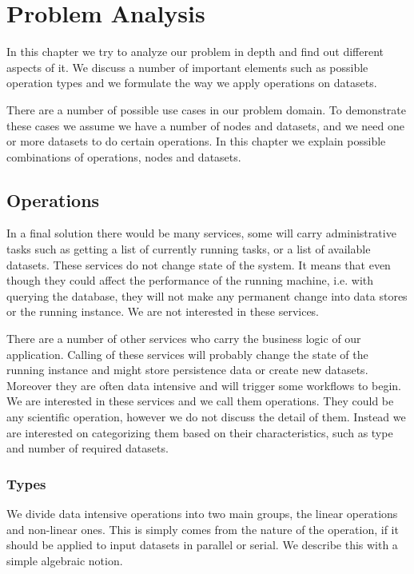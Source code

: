 \chapter{Problem Analysis}
\label{cha:analysis}

In this chapter we try to analyze our problem in depth and find out different aspects of it. We 
discuss a number of important elements such as possible operation types and we formulate the way
we apply operations on datasets.

There are a number of possible use cases in our problem domain. To demonstrate these cases we assume
we have a number of nodes and datasets, and we need one or more datasets to do certain operations.
In this chapter we explain possible combinations of operations, nodes and datasets.

\section{Operations}
In a final solution there would be many services, some will carry administrative tasks such as
getting a list of currently running tasks, or a list of available datasets. These services do not
change state of the system. It means that even though they could affect the performance of the 
running machine, i.e. with querying the database, they will not make any permanent change into 
data stores or the running instance. We are not interested in these services.

There are a number of other services who carry the business logic of our application. Calling of
these services will probably change the state of the running instance and might store persistence
data or create new datasets. Moreover they are often data intensive and will trigger some workflows
to begin. We are interested in these services and we call them operations. They could be
any scientific operation, however we do not discuss the detail of them. Instead we are interested on
categorizing them based on their characteristics, such as type and number of required datasets.
\subsection{Types}
We divide data intensive operations into two main groups, the linear operations and non-linear ones.
This is simply comes from the nature of the operation, if it should be applied to input datasets
in parallel or serial. We describe this with a simple algebraic notion.

